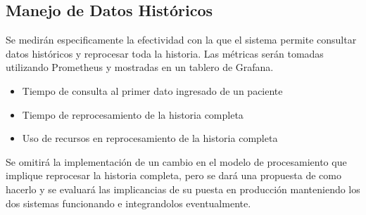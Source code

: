 \subsection{Manejo de Datos Históricos}

Se medirán especificamente la efectividad con la que el sistema permite consultar datos históricos y reprocesar toda la historia.
Las métricas serán tomadas utilizando Prometheus y mostradas en un tablero de Grafana.

\begin{itemize}
    \item Tiempo de consulta al primer dato ingresado de un paciente
    \item Tiempo de reprocesamiento de la historia completa
    \item Uso de recursos en reprocesamiento de la historia completa
\end{itemize}

Se omitirá la implementación de un cambio en el modelo de procesamiento que implique reprocesar la historia completa, 
pero se dará una propuesta de como hacerlo y se evaluará las implicancias de su puesta en producción manteniendo los dos sistemas funcionando e integrandolos eventualmente.